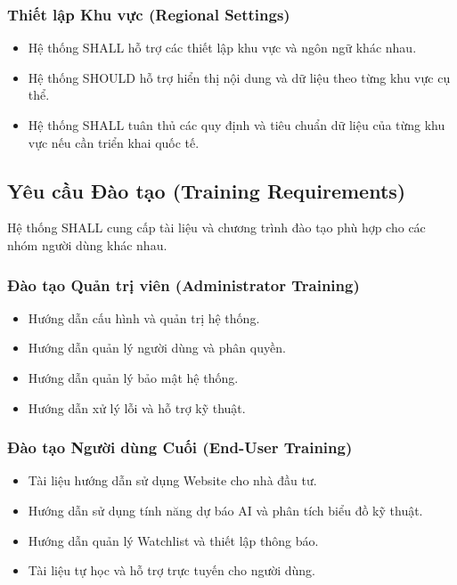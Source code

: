 \documentclass[12pt, a4paper]{article}
\begin{document}
\subsubsection{Thiết lập Khu vực (Regional Settings)}

\begin{itemize}
    \item Hệ thống SHALL hỗ trợ các thiết lập khu vực và ngôn ngữ khác nhau.

    \item Hệ thống SHOULD hỗ trợ hiển thị nội dung và dữ liệu theo từng khu vực cụ thể.

    \item Hệ thống SHALL tuân thủ các quy định và tiêu chuẩn dữ liệu của từng khu vực nếu cần triển khai quốc tế.
\end{itemize}

\subsection{Yêu cầu Đào tạo (Training Requirements)}

Hệ thống SHALL cung cấp tài liệu và chương trình đào tạo phù hợp cho các nhóm người dùng khác nhau.

\subsubsection{Đào tạo Quản trị viên (Administrator Training)}

\begin{itemize}
    \item Hướng dẫn cấu hình và quản trị hệ thống.

    \item Hướng dẫn quản lý người dùng và phân quyền.

    \item Hướng dẫn quản lý bảo mật hệ thống.

    \item Hướng dẫn xử lý lỗi và hỗ trợ kỹ thuật.
\end{itemize}

\subsubsection{Đào tạo Người dùng Cuối (End-User Training)}

\begin{itemize}
    \item Tài liệu hướng dẫn sử dụng Website cho nhà đầu tư.

    \item Hướng dẫn sử dụng tính năng dự báo AI và phân tích biểu đồ kỹ thuật.

    \item Hướng dẫn quản lý Watchlist và thiết lập thông báo.

    \item Tài liệu tự học và hỗ trợ trực tuyến cho người dùng.
\end{itemize}
\end{document}
